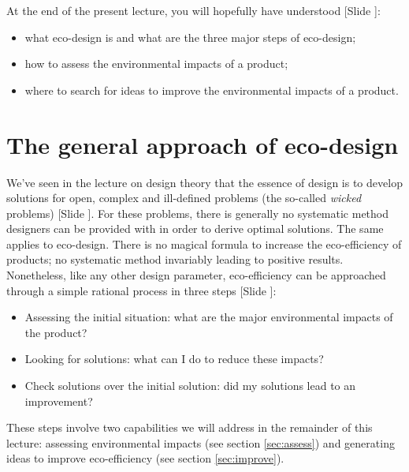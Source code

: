 \documentclass{article}
\newcounter{slide}
\begin{document}
At the end of the present lecture, you will hopefully have understood {\color{blue}[Slide ]}:
\begin{itemize}
	\item what eco-design is and what are the three major steps of eco-design;
	\item how to assess the environmental impacts of a product;
	\item where to search for ideas to improve the environmental impacts of a product.
\end{itemize}

\section{The general approach of eco-design}
\label{sec:ecodesign}

We've seen in the lecture on design theory that the essence of design is to develop solutions for open, complex and ill-defined problems (the so-called \emph{wicked} problems) {\color{blue}[Slide ]}. For these problems, there is generally no systematic method designers can be provided with in order to derive optimal solutions. The same applies to eco-design. There is no magical formula to increase the eco-efficiency of products; no systematic method invariably leading to positive results. Nonetheless, like any other design parameter, eco-efficiency can be approached through a simple rational process in three steps {\color{blue}[Slide ]}:
\begin{itemize}
	\item Assessing the initial situation: what are the major environmental impacts of the product?
	\item Looking for solutions: what can I do to reduce these impacts?
	\item Check solutions over the initial solution: did my solutions lead to an improvement?
\end{itemize}

These steps involve two capabilities we will address in the remainder of this lecture: assessing environmental impacts (see section \ref{sec:assess}) and generating ideas to improve eco-efficiency (see section \ref{sec:improve}). 
\end{document}

